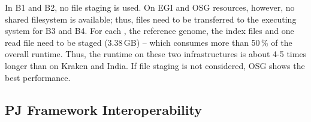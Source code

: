 \documentclass{sig-alternate}
\begin{document}
In B1 and B2, no file staging is used. On EGI and OSG resources, however, no
shared filesystem is available; thus, files need to be transferred to the
executing system for B3 and B4. For each \cu, the reference genome, the
index files and one read file need to be staged (3.38\,GB) -- which consumes
more than 50\,\% of the overall runtime. Thus, the runtime on these two
infrastructures is about 4-5 times longer than on Kraken and India. If file
staging is not considered, OSG shows the best performance.  









\subsection{PJ Framework Interoperability}
\label{sec:experiment-interop}
\end{document}
